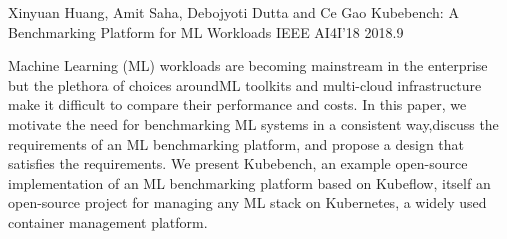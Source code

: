 \begin{cventries}
  \cventry
    {Xinyuan Huang, Amit Saha, Debojyoti Dutta and Ce Gao} %
    {Kubebench: A Benchmarking Platform for ML Workloads} %
    {IEEE AI4I'18} %
    {2018.9} %
    {
      \begin{cvitems} %
        \item {
          Machine Learning (ML) workloads are becoming mainstream in the enterprise but the plethora of choices aroundML toolkits and multi-cloud infrastructure make it difficult to compare their performance and costs. In this paper, we motivate the need for benchmarking ML systems in a consistent way,discuss the requirements of an ML benchmarking platform, and propose a design that satisfies the requirements. We present Kubebench, an example open-source implementation of an ML benchmarking platform based on Kubeflow, itself an open-source project for managing any ML stack on Kubernetes, a widely used container management platform.
        }
      \end{cvitems}
    }

\end{cventries}
